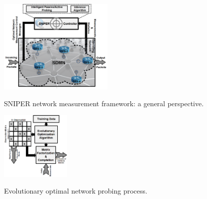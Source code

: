 \begin{figure}[t]
  \begin{center}
    {\includegraphics[keepaspectratio, width=0.49\textwidth]{GBDSNIPER.png}}
  \end{center}
  \caption{\footnotesize{SNIPER network measurement framework: a general perspective.}}
  \label{fig:GBDSNIPER}
\end{figure}
\begin{figure}[t]
  \begin{center}
    {\includegraphics[keepaspectratio, width=0.30\textwidth]{EVSmpMC.png}} \\  %
  \end{center}
  \caption{\small{Evolutionary optimal network probing process.}}
  \label{fig:EVSmpMC}
\end{figure}

